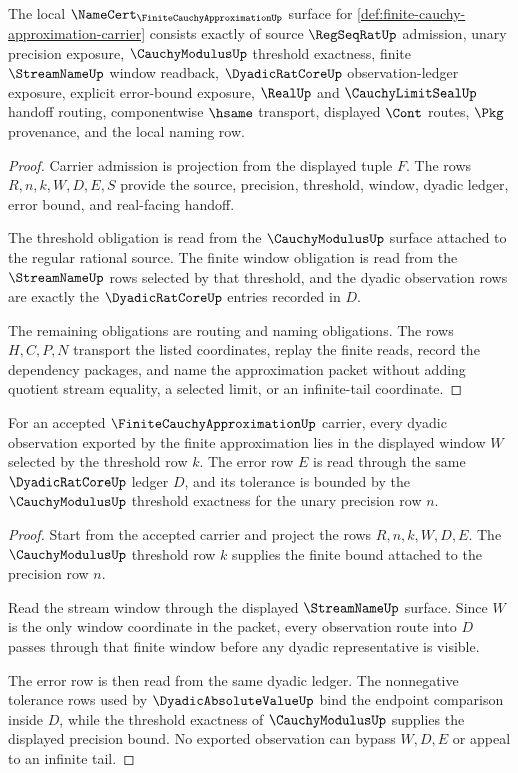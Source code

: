\begin{theorem}
\label{thm:finite-cauchy-approximation-namecert-obligations}
The local $\NameCert_{\FiniteCauchyApproximationUp}$ surface for \autoref{def:finite-cauchy-approximation-carrier} consists exactly of source $\RegSeqRatUp$ admission, unary precision exposure, $\CauchyModulusUp$ threshold exactness, finite $\StreamNameUp$ window readback, $\DyadicRatCoreUp$ observation-ledger exposure, explicit error-bound exposure, $\RealUp$ and $\CauchyLimitSealUp$ handoff routing, componentwise $\hsame$ transport, displayed $\Cont$ routes, $\Pkg$ provenance, and the local naming row.
\end{theorem}
\begin{proof}
Carrier admission is projection from the displayed tuple $F$. The rows $R,n,k,W,D,E,S$ provide the source, precision, threshold, window, dyadic ledger, error bound, and real-facing handoff.

The threshold obligation is read from the $\CauchyModulusUp$ surface attached to the regular rational source. The finite window obligation is read from the $\StreamNameUp$ rows selected by that threshold, and the dyadic observation rows are exactly the $\DyadicRatCoreUp$ entries recorded in $D$.

The remaining obligations are routing and naming obligations. The rows $H,C,P,N$ transport the listed coordinates, replay the finite reads, record the dependency packages, and name the approximation packet without adding quotient stream equality, a selected limit, or an infinite-tail coordinate.
\end{proof}

\begin{theorem}
\label{thm:finite-cauchy-approximation-window-soundness}
For an accepted $\FiniteCauchyApproximationUp$ carrier, every dyadic observation exported by the finite approximation lies in the displayed window $W$ selected by the threshold row $k$. The error row $E$ is read through the same $\DyadicRatCoreUp$ ledger $D$, and its tolerance is bounded by the $\CauchyModulusUp$ threshold exactness for the unary precision row $n$.
\end{theorem}
\begin{proof}
Start from the accepted carrier and project the rows $R,n,k,W,D,E$. The $\CauchyModulusUp$ threshold row $k$ supplies the finite bound attached to the precision row $n$.

Read the stream window through the displayed $\StreamNameUp$ surface. Since $W$ is the only window coordinate in the packet, every observation route into $D$ passes through that finite window before any dyadic representative is visible.

The error row is then read from the same dyadic ledger. The nonnegative tolerance rows used by $\DyadicAbsoluteValueUp$ bind the endpoint comparison inside $D$, while the threshold exactness of $\CauchyModulusUp$ supplies the displayed precision bound. No exported observation can bypass $W,D,E$ or appeal to an infinite tail.
\end{proof}

